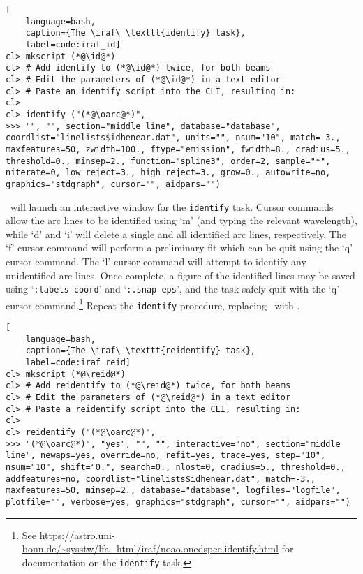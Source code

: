 \begin{lstlisting}[
    language=bash,
    caption={The \iraf\ \texttt{identify} task},
    label=code:iraf_id]
cl> mkscript (*@\id@*)
cl> # Add identify to (*@\id@*) twice, for both beams
cl> # Edit the parameters of (*@\id@*) in a text editor
cl> # Paste an identify script into the CLI, resulting in:
cl> 
cl> identify ("(*@\oarc@*)",
>>> "", "", section="middle line", database="database", coordlist="linelists$idhenear.dat", units="", nsum="10", match=-3., maxfeatures=50, zwidth=100., ftype="emission", fwidth=8., cradius=5., threshold=0., minsep=2., function="spline3", order=2, sample="*", niterate=0, low_reject=3., high_reject=3., grow=0., autowrite=no, graphics="stdgraph", cursor="", aidpars="")
\end{lstlisting}

\iraf\ will launch an interactive window for the \texttt{identify} task. Cursor commands allow the arc lines to be identified using `m' (and typing the relevant wavelength), while `d' and `i' will delete a single and all identified arc lines, respectively. The `f' cursor command will perform a preliminary fit which can be quit using the `q' cursor command. The `l' cursor command will attempt to identify any unidentified arc lines. Once complete, a figure of the identified lines may be saved using `\texttt{:labels coord}' and `\texttt{:.snap eps}', and the task safely quit with the `q' cursor command.\footnote{See \protect\url{https://astro.uni-bonn.de/~sysstw/lfa_html/iraf/noao.onedspec.identify.html} for documentation on the \texttt{identify} task.} Repeat the \texttt{identify} procedure, replacing \oarc\ with \earc.

\begin{lstlisting}[
    language=bash,
    caption={The \iraf\ \texttt{reidentify} task},
    label=code:iraf_reid]
cl> mkscript (*@\reid@*)
cl> # Add reidentify to (*@\reid@*) twice, for both beams
cl> # Edit the parameters of (*@\reid@*) in a text editor
cl> # Paste a reidentify script into the CLI, resulting in:
cl> 
cl> reidentify ("(*@\oarc@*)",
>>> "(*@\oarc@*)", "yes", "", "", interactive="no", section="middle line", newaps=yes, override=no, refit=yes, trace=yes, step="10", nsum="10", shift="0.", search=0., nlost=0, cradius=5., threshold=0., addfeatures=no, coordlist="linelists$idhenear.dat", match=-3., maxfeatures=50, minsep=2., database="database", logfiles="logfile", plotfile="", verbose=yes, graphics="stdgraph", cursor="", aidpars="")
\end{lstlisting}

